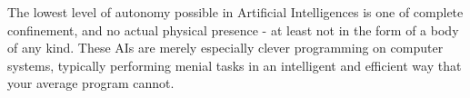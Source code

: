 The lowest level of autonomy possible in Artificial Intelligences is one of complete confinement, and no actual physical presence - at least not in the form of a body of any kind. These AIs are merely especially clever programming on computer systems, typically performing menial tasks in an intelligent and efficient way that your average program cannot.